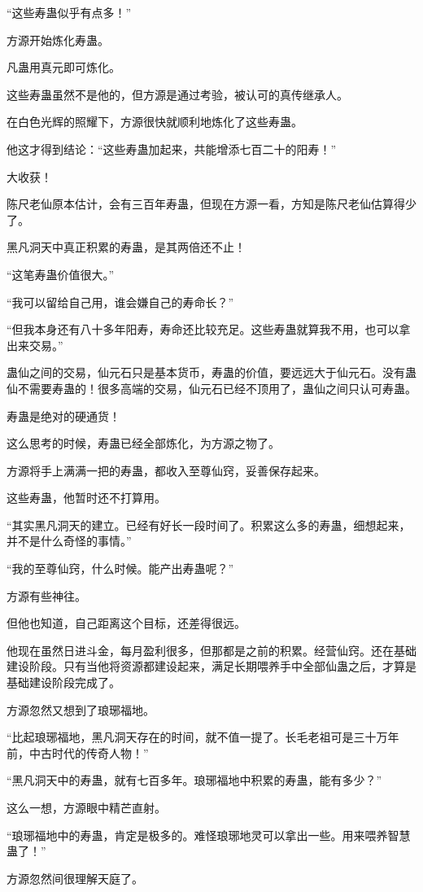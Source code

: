 \begin{this_body}
“这些寿蛊似乎有点多！”

方源开始炼化寿蛊。

凡蛊用真元即可炼化。

这些寿蛊虽然不是他的，但方源是通过考验，被认可的真传继承人。

在白色光辉的照耀下，方源很快就顺利地炼化了这些寿蛊。

他这才得到结论：“这些寿蛊加起来，共能增添七百二十的阳寿！”

大收获！

陈尺老仙原本估计，会有三百年寿蛊，但现在方源一看，方知是陈尺老仙估算得少了。

黑凡洞天中真正积累的寿蛊，是其两倍还不止！

“这笔寿蛊价值很大。”

“我可以留给自己用，谁会嫌自己的寿命长？”

“但我本身还有八十多年阳寿，寿命还比较充足。这些寿蛊就算我不用，也可以拿出来交易。”

蛊仙之间的交易，仙元石只是基本货币，寿蛊的价值，要远远大于仙元石。没有蛊仙不需要寿蛊的！很多高端的交易，仙元石已经不顶用了，蛊仙之间只认可寿蛊。

寿蛊是绝对的硬通货！

这么思考的时候，寿蛊已经全部炼化，为方源之物了。

方源将手上满满一把的寿蛊，都收入至尊仙窍，妥善保存起来。

这些寿蛊，他暂时还不打算用。

“其实黑凡洞天的建立。已经有好长一段时间了。积累这么多的寿蛊，细想起来，并不是什么奇怪的事情。”

“我的至尊仙窍，什么时候。能产出寿蛊呢？”

方源有些神往。

但他也知道，自己距离这个目标，还差得很远。

他现在虽然日进斗金，每月盈利很多，但那都是之前的积累。经营仙窍。还在基础建设阶段。只有当他将资源都建设起来，满足长期喂养手中全部仙蛊之后，才算是基础建设阶段完成了。

方源忽然又想到了琅琊福地。

“比起琅琊福地，黑凡洞天存在的时间，就不值一提了。长毛老祖可是三十万年前，中古时代的传奇人物！”

“黑凡洞天中的寿蛊，就有七百多年。琅琊福地中积累的寿蛊，能有多少？”

这么一想，方源眼中精芒直射。

“琅琊福地中的寿蛊，肯定是极多的。难怪琅琊地灵可以拿出一些。用来喂养智慧蛊了！”

方源忽然间很理解天庭了。


\end{this_body}
